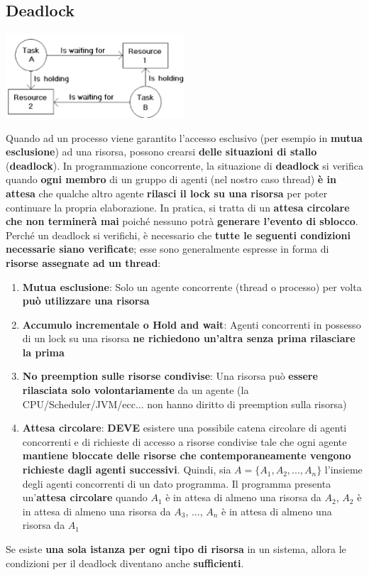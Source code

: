 \documentclass[12pt]{article}
\begin{document}
\subsection{Deadlock}
\begin{center}
    \includegraphics[width = 0.50\textwidth]{Images/104.PNG}
\end{center}
Quando ad un processo viene garantito l'accesso esclusivo (per esempio in \textbf{mutua esclusione}) ad una risorsa, possono crearsi \textbf{delle situazioni di stallo} (\textbf{deadlock}). In programmazione concorrente, la situazione di \textbf{deadlock} si verifica quando \textbf{ogni membro} di un gruppo di agenti (nel nostro caso thread) \textbf{è in attesa} che qualche altro agente \textbf{rilasci il lock su una risorsa} per poter continuare la propria elaborazione. In pratica, si tratta di un \textbf{attesa circolare che non terminerà mai} poiché nessuno potrà \textbf{generare l'evento di sblocco}.
Perché un deadlock si verifichi, è necessario che \textbf{tutte le seguenti condizioni necessarie siano verificate}; esse sono generalmente espresse in forma di \textbf{risorse assegnate ad un thread}:
\begin{enumerate}
    \item \textbf{Mutua esclusione}: Solo un agente concorrente (thread o processo) per volta \textbf{può utilizzare una risorsa}
    \item \textbf{Accumulo incrementale o Hold and wait}: Agenti concorrenti in possesso di un lock su una risorsa \textbf{ne richiedono un'altra senza prima rilasciare la prima}
    \item \textbf{No preemption sulle risorse condivise}: Una risorsa può \textbf{essere rilasciata solo volontariamente} da un agente (la CPU/Scheduler/JVM/ecc... non hanno diritto di preemption sulla risorsa)
    \item \textbf{Attesa circolare}: \textbf{DEVE} esistere una possibile catena circolare di agenti concorrenti e di richieste di accesso a risorse condivise tale che ogni agente \textbf{mantiene bloccate delle risorse che contemporaneamente vengono richieste dagli agenti successivi}. Quindi, sia $A = \{A_1, A_2, ..., A_n\}$ l'insieme degli agenti concorrenti di un dato programma. Il programma presenta un'\textbf{attesa circolare} quando $A_1$ è in attesa di almeno una risorsa da $A_2$, $A_2$ è in attesa di almeno una risorsa da $A_3$, ..., $A_n$ è in attesa di almeno una risorsa da $A_1$
\end{enumerate}
Se esiste \textbf{una sola istanza per ogni tipo di risorsa} in un sistema, allora le condizioni per il deadlock diventano anche \textbf{sufficienti}.
\end{document}
